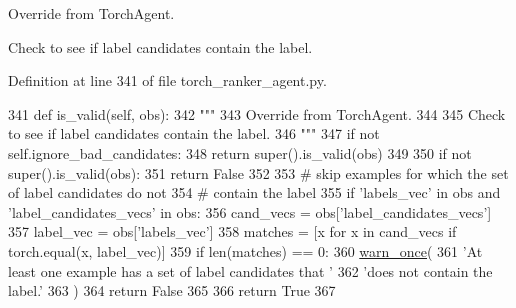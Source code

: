 \begin{DoxyVerb}Override from TorchAgent.

Check to see if label candidates contain the label.
\end{DoxyVerb}
 

Definition at line 341 of file torch\+\_\+ranker\+\_\+agent.\+py.


\begin{DoxyCode}
341     \textcolor{keyword}{def }is\_valid(self, obs):
342         \textcolor{stringliteral}{"""}
343 \textcolor{stringliteral}{        Override from TorchAgent.}
344 \textcolor{stringliteral}{}
345 \textcolor{stringliteral}{        Check to see if label candidates contain the label.}
346 \textcolor{stringliteral}{        """}
347         \textcolor{keywordflow}{if} \textcolor{keywordflow}{not} self.ignore\_bad\_candidates:
348             \textcolor{keywordflow}{return} super().is\_valid(obs)
349 
350         \textcolor{keywordflow}{if} \textcolor{keywordflow}{not} super().is\_valid(obs):
351             \textcolor{keywordflow}{return} \textcolor{keyword}{False}
352 
353         \textcolor{comment}{# skip examples for which the set of label candidates do not}
354         \textcolor{comment}{# contain the label}
355         \textcolor{keywordflow}{if} \textcolor{stringliteral}{'labels\_vec'} \textcolor{keywordflow}{in} obs \textcolor{keywordflow}{and} \textcolor{stringliteral}{'label\_candidates\_vecs'} \textcolor{keywordflow}{in} obs:
356             cand\_vecs = obs[\textcolor{stringliteral}{'label\_candidates\_vecs'}]
357             label\_vec = obs[\textcolor{stringliteral}{'labels\_vec'}]
358             matches = [x \textcolor{keywordflow}{for} x \textcolor{keywordflow}{in} cand\_vecs \textcolor{keywordflow}{if} torch.equal(x, label\_vec)]
359             \textcolor{keywordflow}{if} len(matches) == 0:
360                 \hyperlink{namespaceparlai_1_1utils_1_1misc_a884a3aefa90581f53bc592fa6a78dc43}{warn\_once}(
361                     \textcolor{stringliteral}{'At least one example has a set of label candidates that '}
362                     \textcolor{stringliteral}{'does not contain the label.'}
363                 )
364                 \textcolor{keywordflow}{return} \textcolor{keyword}{False}
365 
366         \textcolor{keywordflow}{return} \textcolor{keyword}{True}
367 
\end{DoxyCode}
\mbox{\label{classparlai_1_1core_1_1torch__ranker__agent_1_1TorchRankerAgent_a353991d201d8889c453bf72c15ec78a9}} 
